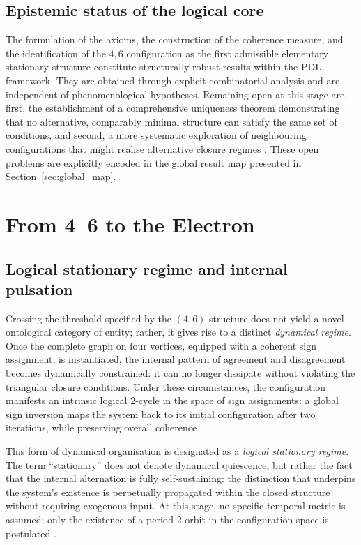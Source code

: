 \documentclass{article}
\begin{document}
\subsection{Epistemic status of the logical core}
\label{subsec:logical_status}

The formulation of the axioms, the construction of the coherence measure, and the identification of the \(4,6\) configuration as the first admissible elementary stationary structure constitute structurally robust results within the PDL framework. They are obtained through explicit combinatorial analysis and are independent of phenomenological hypotheses. Remaining open at this stage are, first, the establishment of a comprehensive uniqueness theorem demonstrating that no alternative, comparably minimal structure can satisfy the same set of conditions, and second, a more systematic exploration of neighbouring configurations that might realise alternative closure regimes \citep{PDL_position}. These open problems are explicitly encoded in the global result map presented in Section~\ref{sec:global_map}.

\section{From 4--6 to the Electron}
\label{sec:four_six_electron}

\subsection{Logical stationary regime and internal pulsation}
\label{subsec:logical_stationary}

Crossing the threshold specified by the \((4,6)\) structure does not yield a novel ontological category of entity; rather, it gives rise to a distinct \emph{dynamical regime}. Once the complete graph on four vertices, equipped with a coherent sign assignment, is instantiated, the internal pattern of agreement and disagreement becomes dynamically constrained: it can no longer dissipate without violating the triangular closure conditions. Under these circumstances, the configuration manifests an intrinsic logical 2-cycle in the space of sign assignments: a global sign inversion maps the system back to its initial configuration after two iterations, while preserving overall coherence
\citep{PDL_Main_2026,PDL_intro}.

This form of dynamical organisation is designated as a \emph{logical stationary regime}. The term “stationary” does not denote dynamical quiescence, but rather the fact that the internal alternation is fully self-sustaining: the distinction that underpins the system’s existence is perpetually propagated within the closed structure without requiring exogenous input. At this stage, no specific temporal metric is assumed; only the existence of a period-2 orbit in the configuration space is postulated
\citep{PDL_Main_2026,PDL_position}.
\end{document}
